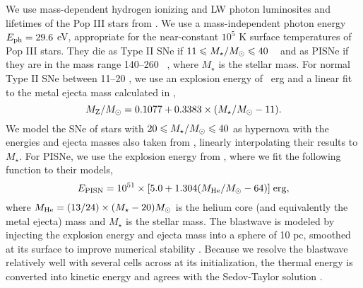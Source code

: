 \documentclass[useAMS,usenatbib]{mn2e}
\begin{document}
We use mass-dependent hydrogen ionizing and LW photon luminosites and
lifetimes of the Pop III stars from \citet{Schaerer02}.  We use a
mass-independent photon energy $E_{\rm ph} = 29.6$ eV, appropriate for
the near-constant $10^5$ K surface temperatures of Pop III stars.
They die as Type II SNe if $11 \le M_\star/\Ms \le 40$
\Ms~\citep{Woosley95} and as PISNe if they are in the mass range
140--260 \Ms~\citep{Heger03}, where $M_\star$ is the stellar mass.
For normal Type II SNe between 11--20 \Ms, we use an explosion energy
of ~erg and a linear fit to the metal ejecta mass calculated
in \citet{Nomoto06},
%
\begin{equation}
  \label{eqn:typeii}
  M_{\rm Z}/\Ms = 0.1077 + 0.3383 \times (M_\star/\Ms - 11).
\end{equation}
%
We model the SNe of stars with $20 \le M_\star/\Ms \le 40$ as
hypernova with the energies and ejecta masses also taken from
\citeauthor{Nomoto06}, linearly interpolating their results to
$M_\star$.  For PISNe, we use the explosion energy from
\citet{Heger02}, where we fit the following function to their models,
%
\begin{equation}
  \label{eqn:pisn}
  E_{\rm PISN} = 10^{51} \times [5.0 + 1.304 (M_{\rm He}/\Ms - 64)] \; \mathrm{erg},
\end{equation}
%
where $M_{\rm He} = (13/24) \times (M_\star - 20) \Ms$ is the helium
core (and equivalently the metal ejecta) mass and $M_\star$ is the
stellar mass.  The blastwave is modeled by injecting the explosion
energy and ejecta mass into a sphere of 10 pc, smoothed at its surface
to improve numerical stability \citep{Wise08_Gal}.  Because we resolve
the blastwave relatively well with several cells across at its
initialization, the thermal energy is converted into kinetic energy
and agrees with the Sedov-Taylor solution \citep[e.g.][]{Greif07}.
\end{document}
